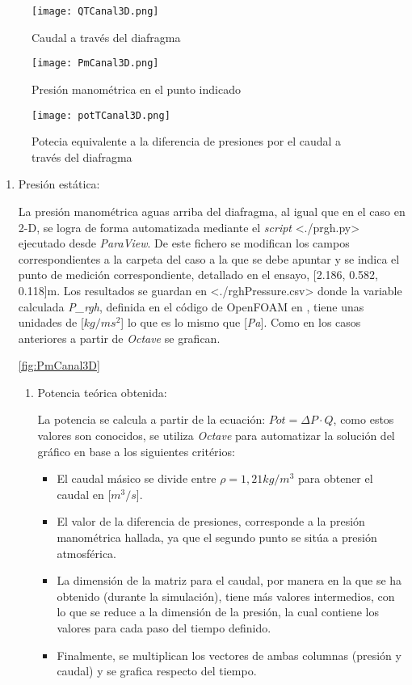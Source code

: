 \begin{figure}
\centering
\texttt{[image: QTCanal3D.png]}
\caption{Caudal a través del diafragma}
\label{fig:QTCanal3D}
\end{figure}

\begin{figure}
\centering
\texttt{[image: PmCanal3D.png]}
\caption{Presión manométrica en el punto indicado}
\label{fig:PmCanal3D}
\end{figure}

\begin{figure}
\centering
\texttt{[image: potTCanal3D.png]}
\caption[Potencia máxima]{Potecia equivalente a la diferencia de presiones por el caudal a través del diafragma}
\label{fig:potTCanal3D}
\end{figure}

\begin{enumerate}
\def\labelenumi{\arabic{enumi}.}
\item
  Presión estática:

  La presión manométrica aguas arriba del diafragma, al igual que en el
  caso en 2-D, se logra de forma automatizada mediante el \emph{script}
  \textless{}./prgh.py\textgreater{} ejecutado desde \emph{ParaView}. De
  este fichero se modifican los campos correspondientes a la carpeta del
  caso a la que se debe apuntar y se indica el punto de medición
  correspondiente, detallado en el ensayo, {[}2.186, 0.582, 0.118{]}m.
  Los resultados se guardan en
  \textless{}./rghPressure.csv\textgreater{} donde la variable calculada
  \emph{P\_rgh}, definida en el código de OpenFOAM en , tiene unas
  unidades de {[}\(kg/ms^2\){]} lo que es lo mismo que {[}\emph{Pa}{]}.
  Como en los casos anteriores a partir de \emph{Octave} se grafican.

  \autoref{fig:PmCanal3D}

\begin{enumerate}
\def\labelenumi{\arabic{enumi}.}
\item
  Potencia teórica obtenida:

  La potencia se calcula a partir de la ecuación: \(Pot=\Delta P·Q\),
  como estos valores son conocidos, se utiliza \emph{Octave} para
  automatizar la solución del gráfico en base a los siguientes
  critérios:

  \begin{itemize}
  \item
    El caudal másico se divide entre \(\rho=1,21kg/m^3\) para obtener el
    caudal en {[}\(m^3/s\){]}.
  \item
    El valor de la diferencia de presiones, corresponde a la presión
    manométrica hallada, ya que el segundo punto se sitúa a presión
    atmosférica.
  \item
    La dimensión de la matriz para el caudal, por manera en la que se ha
    obtenido (durante la simulación), tiene más valores intermedios, con
    lo que se reduce a la dimensión de la presión, la cual contiene los
    valores para cada paso del tiempo definido.
  \item
    Finalmente, se multiplican los vectores de ambas columnas (presión y
    caudal) y se grafica respecto del tiempo.
  \end{itemize}


\end{enumerate}
\end{enumerate}
